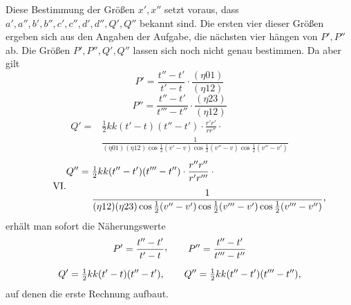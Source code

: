 Diese Bestimmung der Größen $x',x''$ setzt voraus, dass\newline $a',a'',b',b'',c',c'',d',d'',Q',Q''$ bekannt sind. Die ersten vier dieser Größen ergeben sich aus den Angaben der Aufgabe, die nächsten vier hängen von $P',P''$ ab. Die Größen $P',P'',Q',Q''$ lassen sich noch nicht genau bestimmen. Da aber gilt
\[
\tag*{III.}P'=\frac{t''-t'}{t'-t}\cdot\frac{(\eta01)}{(\eta12)}
\]
\[
\tag*{IV.}P''=\frac{t''-t'}{t'''-t''}\cdot\frac{(\eta23)}{(\eta12)}
\]
\[
\tag*{V.}\begin{aligned}
Q'={}&\tfrac12kk(t'-t)(t''-t')\cdot\frac{r'r'}{rr''}\cdot{}\\[.5em]
&\frac{1}{(\eta01)(\eta12)\cos\tfrac12(v'-v)\cos\tfrac12(v''-v)\cos\tfrac12(v''-v')}
\end{aligned}
\]
\[
\tag*{VI.}\begin{aligned}
Q''={}&\tfrac12kk(t''-t')(t'''-t'')\cdot\frac{r''r''}{r'r'''}\cdot{}\\[.5em]
&\frac{1}{(\eta12)(\eta23)\cos\tfrac12(v''-v')\cos\tfrac12(v'''-v')\cos\tfrac12(v'''-v'')}\mathpunct{\raisebox{.45ex}{,}}
\end{aligned}
\]
erhält man sofort die Näherungswerte
\[
\begin{gathered}
P'=\frac{t''-t'}{t'-t}\mathpunct{\raisebox{.45ex}{,}}\qquad P''=\frac{t''-t'}{t'''-t''}\\[.6em]
Q'=\tfrac12kk(t'-t)(t''-t'),\qquad Q''=\tfrac12kk(t''-t')(t'''-t''),
\end{gathered}
\]
auf denen die erste Rechnung aufbaut.
